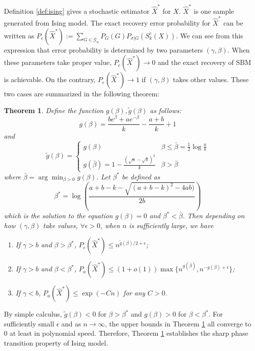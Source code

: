 \documentclass[journal]{IEEEtran}
\newtheorem{theorem}{Theorem}
\newcommand{\cG}{\mathcal{G}}
\newcommand{\1}{\mathbbm{1}}
\begin{document}
Definition \ref{def:ising} gives a stochastic estimator $\hat{X}^*$ for $X$. $\hat{X}^*$ is one sample generated from Ising model. The exact recovery error probability for $\hat{X}^*$ can be written as $P_e(\hat{X}^*) := \sum_{G \in \cG_n} P_G(G) P_{\sigma | G}(S^c_k(X))$. We can see from this expression that error probability is determined
by two parameters $(\gamma, \beta)$. When these parameters take proper value, $ P_e(\hat{X}^*)\to 0$ and the exact recovery of SBM is achievable. On the contrary, $P_e(\hat{X}^*) \to 1$ if $(\gamma, \beta)$ takes other values.
These two cases are summarized in the following theorem:
\begin{theorem}\label{thm:phase_transition}
Define the function $g(\beta), \tilde{g}(\beta)$ as follows:
\begin{equation}
g(\beta) = \frac{be^{\beta} + a e^{-\beta}}{k} - \frac{a+b}{k} +1
\end{equation}
and
\begin{equation}
\tilde{g}(\beta) = \begin{cases}
g(\beta) & \beta \leq \bar{\beta} = \frac{1}{2}\log \frac{a}{b} \\
g(\bar{\beta}) = 1 - \frac{(\sqrt{a} - \sqrt{b})^2}{k} & \beta > \bar{\beta}
\end{cases}
\end{equation}
where $\bar{\beta} =  \arg\min_{\beta > 0} g(\beta)$.
Let $\beta^*$ be defined as
$$
\beta^* = \log(\frac{a + b - k - \sqrt{(a + b - k)^2 - 4 a b)}}{2  b})
$$
which is the solution to the equation $g(\beta) = 0$ and $\beta^* < \bar{\beta}$. Then depending on
how $(\gamma, \beta)$ take values, $\forall \epsilon > 0$, when $n$ is sufficiently large, we have
\begin{enumerate}
\item If $\gamma > b$ and $\beta > \beta^*$,  $P_e(\hat{X}^*) \leq n^{\tilde{g}(\beta)/2 + \epsilon}$;
\item If $\gamma > b$ and $\beta < \beta^*$, $P_a(\hat{X}^*) \leq (1+o(1))\max\{n^{g(\bar{\beta})}, n^{-g(\beta) + \epsilon}\}$;
\item If $\gamma < b$, $P_a(\hat{X}^*) \leq \exp(-C n)$ for any $C>0$.
\end{enumerate}
\end{theorem}
By simple calculus, $\tilde{g}(\beta) < 0$ for $\beta> \beta^*$ and $g(\beta)>0$ for $\beta < \beta^*$.
For sufficiently small $\epsilon$ and as $n \to \infty$, the upper bounds in Theorem \ref{thm:phase_transition} all converge to $0$ at least
in polynomial speed.
Therefore, Theorem \ref{thm:phase_transition} establishes the sharp phase transition property of Ising model.
\end{document}
